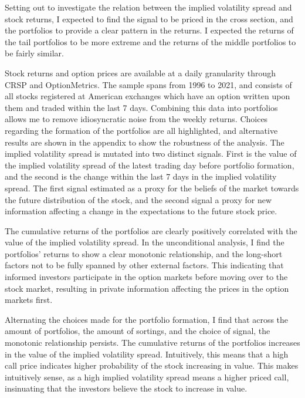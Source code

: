 
Setting out to investigate the relation between the implied volatility spread and stock returns, I expected to find the signal to be priced in the cross section, and the portfolios to provide a clear pattern in the returns. I expected the returns of the tail portfolios to be more extreme and the returns of the middle portfolios to be fairly similar. 

Stock returns and option prices are available at a daily granularity through CRSP and OptionMetrics. The sample spans from 1996 to 2021, and consists of all stocks registered at American exchanges which have an option written upon them and traded within the last 7 days. Combining this data into portfolios allows me to remove idiosyncratic noise from the weekly returns. Choices regarding the formation of the portfolios are all highlighted, and alternative results are shown in the appendix to show the robustness of the analysis. The implied volatility spread is mutated into two distinct signals. First is the value of the implied volatility spread of the latest trading day before portfolio formation, and the second is the change within the last 7 days in the implied volatility spread. The first signal estimated as a proxy for the beliefs of the market towards the future distribution of the stock, and the second signal a proxy for new information affecting a change in the expectations to the future stock price.

The cumulative returns of the portfolios are clearly positively correlated with the value of the implied volatility spread. In the unconditional analysis, I find the portfolios' returns to show a clear monotonic relationship, and the long-short factors not to be fully spanned by other external factors. This indicating that informed investors participate in the option markets before moving over to the stock market, resulting in private information affecting the prices in the option markets first.

Alternating the choices made for the portfolio formation, I find that across the amount of portfolios, the amount of sortings, and the choice of signal, the monotonic relationship persists. The cumulative returns of the portfolios increases in the value of the implied volatility spread. Intuitively, this means that a high call price indicates higher probability of the stock increasing in value. This makes intuitively sense, as a high implied volatility spread means a higher priced call, insinuating that the investors believe the stock to increase in value.

